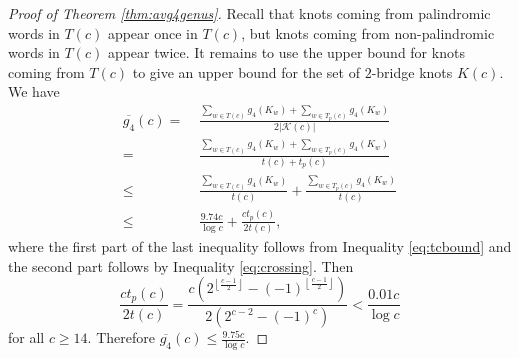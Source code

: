 \documentclass[12pt]{amsart}
\theoremstyle{definition}
\theoremstyle{remark}
\numberwithin{equation}{section}
\begin{document}
\begin{proof}[Proof of Theorem \ref{thm:avg4genus}]
Recall that knots coming from palindromic words in $T(c)$ appear once in $T(c)$, but knots coming from non-palindromic words in $T(c)$ appear twice. It remains to use the upper bound for knots coming from $T(c)$ to give an upper bound for the set of $2$-bridge knots $K(c)$. We have
\begin{align*}\overline{g_4}(c) = &\; \frac{\sum_{w\in T(c)} g_4(K_w) + \sum_{w\in T_p(c)} g_4(K_w)}{2|\mathcal{K}(c)|}\\
= & \; \frac{\sum_{w\in T(c)} g_4(K_w) + \sum_{w\in T_p(c)} g_4(K_w)}{t(c) + t_p(c)}\\
\leq & \;\frac{\sum_{w\in T(c)} g_4(K_w)}{t(c)}  + \frac{\sum_{w\in T_p(c)} g_4(K_w)}{t(c)}\\
\leq & \; \frac{9.74 c}{\log c} + \frac{c t_p(c)}{2t(c)},
\end{align*}
where the first part of the last inequality follows from Inequality \eqref{eq:tcbound} and the second part follows by Inequality \eqref{eq:crossing}. Then
\[\frac{c t_p(c)}{2t(c)} = \frac{c\left(2^{\left\lfloor\frac{c-1}{2}\right\rfloor}-(-1)^{\left\lfloor\frac{c-1}{2}\right\rfloor}\right)}{2\left(2^{c-2}-(-1)^{c}\right)} < \frac{0.01c}{\log c}\]
for all $c\geq 14$. Therefore $\overline{g_4}(c)\leq \frac{9.75c}{\log c}$.
\end{proof}

\fi
\end{document}
